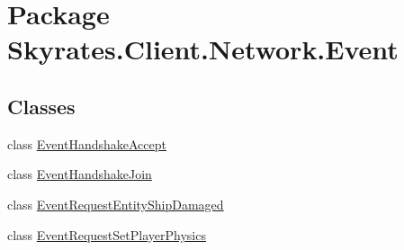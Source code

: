 \hypertarget{namespace_skyrates_1_1_client_1_1_network_1_1_event}{\section{Package Skyrates.\-Client.\-Network.\-Event}
\label{namespace_skyrates_1_1_client_1_1_network_1_1_event}
}
\subsection*{Classes}
\begin{DoxyCompactItemize}
\item 
class \hyperlink{class_skyrates_1_1_client_1_1_network_1_1_event_1_1_event_handshake_accept}{Event\-Handshake\-Accept}
\item 
class \hyperlink{class_skyrates_1_1_client_1_1_network_1_1_event_1_1_event_handshake_join}{Event\-Handshake\-Join}
\item 
class \hyperlink{class_skyrates_1_1_client_1_1_network_1_1_event_1_1_event_request_entity_ship_damaged}{Event\-Request\-Entity\-Ship\-Damaged}
\item 
class \hyperlink{class_skyrates_1_1_client_1_1_network_1_1_event_1_1_event_request_set_player_physics}{Event\-Request\-Set\-Player\-Physics}
\end{DoxyCompactItemize}
